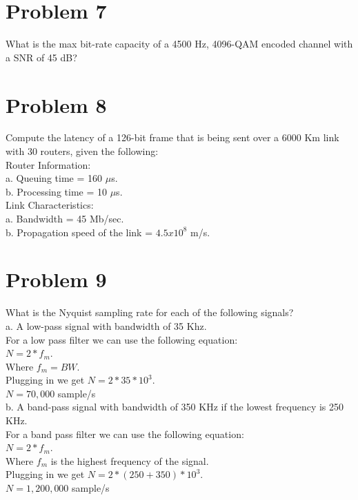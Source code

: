 \documentclass{article}
\begin{document}
\section*{Problem 7}
What is the max bit-rate capacity of a 4500 Hz, 4096-QAM encoded channel with a SNR of
45 dB?\\

\section*{Problem 8}
Compute the latency of a 126-bit frame that is being sent over a 6000 Km link with 30
routers, given the following:\\
\subP Router Information:\\
\subP a. Queuing time = 160 $\mu$s.\\
\subP b. Processing time = 10 $\mu$s.\\
Link Characteristics:\\
\subP a. Bandwidth = 45 Mb/sec.\\
\subP b. Propagation speed of the link = $4.5x10^8$ m/s.\\

\section*{Problem 9} %
What is the Nyquist sampling rate for each of the following signals?\\
\subP a. A low-pass signal with bandwidth of 35 Khz.\\

For a low pass filter we can use the following equation:\\
$N = 2*f_{m}$.\\
Where $f_{m} = BW$.\\
Plugging in we get $N = 2*35 * 10^{3}$.\\
$N = 70,000$ sample/s\\

\subP b. A band-pass signal with bandwidth of 350 KHz if the lowest
frequency is 250 KHz.\\
For a band pass filter we can use the following equation:\\
$N = 2*f_{m}$.\\
Where $f_{m}$ is the highest frequency of the signal.\\
Plugging in we get $N = 2*(250 + 350) * 10^{3}$.\\
$N = 1,200,000$ sample/s\\
\end{document}
